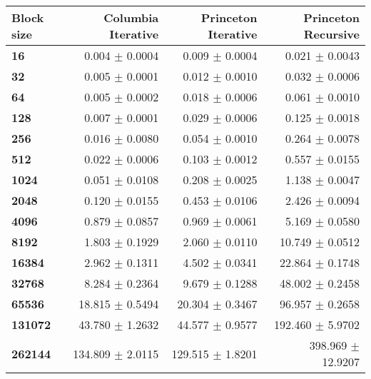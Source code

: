 \begin{tabular}{lrrr}\toprule
\textbf{Block size}  & \textbf{Columbia Iterative} & \textbf{Princeton Iterative} & \textbf{Princeton Recursive}\\\midrule
\textbf{16}  & 0.004 $\pm$ 0.0004 & 0.009 $\pm$ 0.0004 & 0.021 $\pm$ 0.0043\\
\textbf{32}  & 0.005 $\pm$ 0.0001 & 0.012 $\pm$ 0.0010 & 0.032 $\pm$ 0.0006\\
\textbf{64}  & 0.005 $\pm$ 0.0002 & 0.018 $\pm$ 0.0006 & 0.061 $\pm$ 0.0010\\
\textbf{128}  & 0.007 $\pm$ 0.0001 & 0.029 $\pm$ 0.0006 & 0.125 $\pm$ 0.0018\\
\textbf{256}  & 0.016 $\pm$ 0.0080 & 0.054 $\pm$ 0.0010 & 0.264 $\pm$ 0.0078\\
\textbf{512}  & 0.022 $\pm$ 0.0006 & 0.103 $\pm$ 0.0012 & 0.557 $\pm$ 0.0155\\
\textbf{1024}  & 0.051 $\pm$ 0.0108 & 0.208 $\pm$ 0.0025 & 1.138 $\pm$ 0.0047\\
\textbf{2048}  & 0.120 $\pm$ 0.0155 & 0.453 $\pm$ 0.0106 & 2.426 $\pm$ 0.0094\\
\textbf{4096}  & 0.879 $\pm$ 0.0857 & 0.969 $\pm$ 0.0061 & 5.169 $\pm$ 0.0580\\
\textbf{8192}  & 1.803 $\pm$ 0.1929 & 2.060 $\pm$ 0.0110 & 10.749 $\pm$ 0.0512\\
\textbf{16384}  & 2.962 $\pm$ 0.1311 & 4.502 $\pm$ 0.0341 & 22.864 $\pm$ 0.1748\\
\textbf{32768}  & 8.284 $\pm$ 0.2364 & 9.679 $\pm$ 0.1288 & 48.002 $\pm$ 0.2458\\
\textbf{65536}  & 18.815 $\pm$ 0.5494 & 20.304 $\pm$ 0.3467 & 96.957 $\pm$ 0.2658\\
\textbf{131072}  & 43.780 $\pm$ 1.2632 & 44.577 $\pm$ 0.9577 & 192.460 $\pm$ 5.9702\\
\textbf{262144} & 134.809 $\pm$ 2.0115 & 129.515 $\pm$ 1.8201 & 398.969 $\pm$ 12.9207\\
\bottomrule
\end{tabular}
